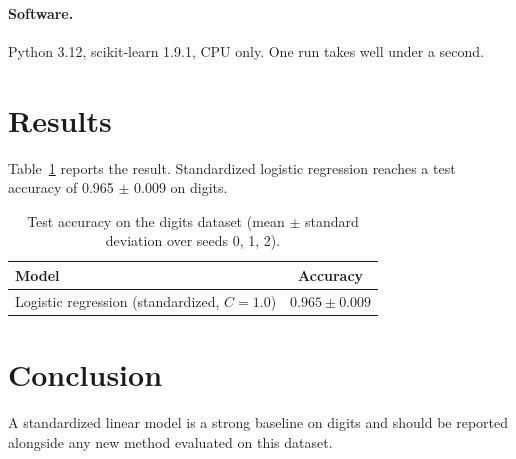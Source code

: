 \documentclass[11pt]{article}
\begin{document}
\paragraph{Software.} Python 3.12, scikit-learn 1.9.1, CPU only. One run takes well under a
second.

\section{Results}
Table~\ref{tab:digits-logreg} reports the result. Standardized logistic regression reaches a
test accuracy of 0.965 $\pm$ 0.009 on digits.

\begin{table}[t]
\centering
\caption{Test accuracy on the digits dataset (mean $\pm$ standard deviation over seeds 0, 1, 2).}
\label{tab:digits-logreg}
\begin{tabular}{lc}
\toprule
Model & Accuracy \\
\midrule
Logistic regression (standardized, $C = 1.0$) & $0.965 \pm 0.009$ \\
\bottomrule
\end{tabular}
\end{table}

\section{Conclusion}
A standardized linear model is a strong baseline on digits and should be reported alongside any
new method evaluated on this dataset.
\end{document}
